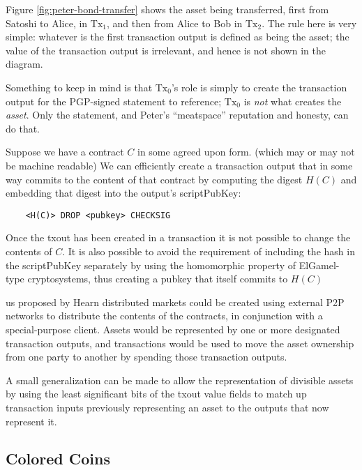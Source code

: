 \documentclass{article}
\begin{document}
Figure \ref{fig:peter-bond-transfer} shows the asset being transferred, first
from Satoshi to Alice, in $\mathrm{Tx}_1$, and then from Alice to Bob in
$\mathrm{Tx}_2$. The rule here is very simple: whatever is the first
transaction output is defined as being the asset; the value of the transaction
output is irrelevant, and hence is not shown in the diagram.

Something to keep in mind is that $\mathrm{Tx}_0$'s role is simply to create
the transaction output for the PGP-signed statement to reference;
$\mathrm{Tx}_0$ is \emph{not} what creates the \emph{asset}. Only the
statement, and Peter's ``meatspace'' reputation and honesty, can do that.




Suppose we have a contract $C$ in some agreed upon form. (which may or may not
be machine readable) We can efficiently create a transaction output that in
some way commits to the content of that contract by computing the digest $H(C)$
and embedding that digest into the output's
scriptPubKey:

\begin{verbatim}
    <H(C)> DROP <pubkey> CHECKSIG
\end{verbatim}

Once the txout has been created in a transaction it is not possible to change
the contents of $C$. It is also possible to avoid the
requirement of including the hash in the scriptPubKey separately by using the
homomorphic property of ElGamel-type cryptosystems, thus creating a pubkey that
itself commits to $H(C)$\cite{DBLP:journals/corr/abs-1212-3257}

us proposed\cite{mike-hearn-distributed-markets} by Hearn distributed markets
could be created using external P2P networks to distribute the contents of the
contracts, in conjunction with a special-purpose client. Assets would be
represented by one or more designated transaction outputs, and transactions
would be used to move the asset ownership from one party to another by spending
those transaction outputs.

A small generalization can be made to allow the representation of divisible
assets by using the least significant bits of the txout value fields to match
up transaction inputs previously representing an asset to the outputs that now
represent it.\cite{peter-todd-fidelity-bonds}


\subsection{Colored Coins}
\end{document}

